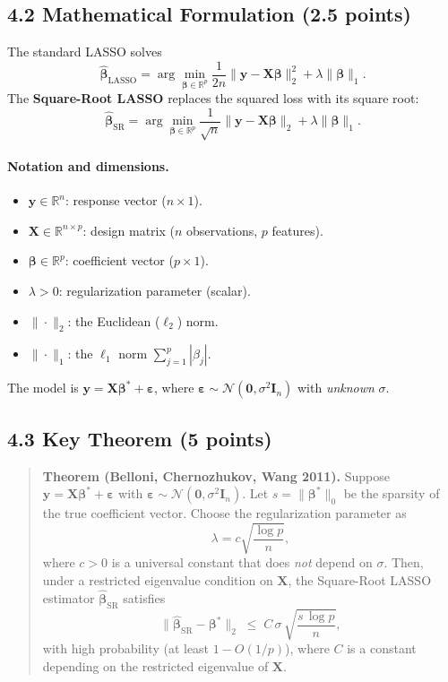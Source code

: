 \documentclass[11pt]{article}
\begin{document}
\subsection*{4.2 Mathematical Formulation (2.5 points)}
The standard LASSO solves
\[
\hat{\boldsymbol{\beta}}_{\text{LASSO}} = \arg\min_{\boldsymbol{\beta} \in \mathbb{R}^p}
\frac{1}{2n}\|\boldsymbol{y} - \boldsymbol{X}\boldsymbol{\beta}\|_2^2 + \lambda \|\boldsymbol{\beta}\|_1.
\]
The \textbf{Square-Root LASSO} replaces the squared loss with its square root:
\[
\boxed{\hat{\boldsymbol{\beta}}_{\text{SR}} = \arg\min_{\boldsymbol{\beta} \in \mathbb{R}^p}
\frac{1}{\sqrt{n}}\|\boldsymbol{y} - \boldsymbol{X}\boldsymbol{\beta}\|_2 + \lambda \|\boldsymbol{\beta}\|_1.}
\]

\paragraph{Notation and dimensions.}
\begin{itemize}
    \item $\boldsymbol{y} \in \mathbb{R}^n$: response vector ($n \times 1$).
    \item $\boldsymbol{X} \in \mathbb{R}^{n \times p}$: design matrix ($n$ observations, $p$ features).
    \item $\boldsymbol{\beta} \in \mathbb{R}^p$: coefficient vector ($p \times 1$).
    \item $\lambda > 0$: regularization parameter (scalar).
    \item $\|\cdot\|_2$: the Euclidean ($\ell_2$) norm.
    \item $\|\cdot\|_1$: the $\ell_1$ norm $\sum_{j=1}^p |\beta_j|$.
\end{itemize}

The model is $\boldsymbol{y} = \boldsymbol{X}\boldsymbol{\beta}^* + \boldsymbol{\varepsilon}$, where
$\boldsymbol{\varepsilon} \sim \mathcal{N}(\boldsymbol{0}, \sigma^2 \boldsymbol{I}_n)$ with \emph{unknown} $\sigma$.

\subsection*{4.3 Key Theorem (5 points)}

\begin{quote}
\textbf{Theorem (Belloni, Chernozhukov, Wang 2011).}
Suppose $\boldsymbol{y} = \boldsymbol{X}\boldsymbol{\beta}^* + \boldsymbol{\varepsilon}$ with $\boldsymbol{\varepsilon} \sim \mathcal{N}(\boldsymbol{0},\sigma^2\boldsymbol{I}_n)$.
Let $s = \|\boldsymbol{\beta}^*\|_0$ be the sparsity of the true coefficient vector. Choose the regularization parameter as
\[
\lambda = c \sqrt{\frac{\log p}{n}},
\]
where $c>0$ is a universal constant that does \emph{not} depend on $\sigma$.
Then, under a restricted eigenvalue condition on $\boldsymbol{X}$, the Square-Root LASSO estimator $\hat{\boldsymbol{\beta}}_{\text{SR}}$ satisfies
\[
\|\hat{\boldsymbol{\beta}}_{\text{SR}} - \boldsymbol{\beta}^*\|_2
\;\leq\; C\,\sigma\,\sqrt{\frac{s\,\log p}{n}},
\]
with high probability (at least $1 - O(1/p)$), where $C$ is a constant depending on the restricted eigenvalue of $\boldsymbol{X}$.
\end{quote}
\end{document}
